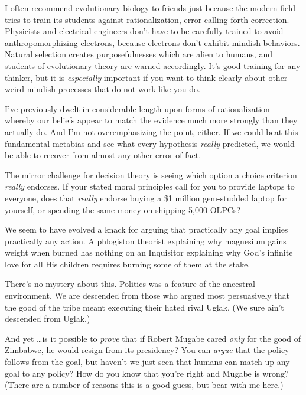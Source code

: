 {
 I often recommend evolutionary biology to friends just because the
modern field tries to train its students against rationalization, error
calling forth correction. Physicists and electrical engineers
don't have to be carefully trained to avoid
anthropomorphizing electrons, because electrons don't
exhibit mindish behaviors. Natural selection creates purposefulnesses
which are alien to humans, and students of evolutionary theory are
warned accordingly. It's good training for any thinker,
but it is \textit{especially} important if you want to think clearly
about other weird mindish processes that do not work like you do.}

\myendsectiontext


\bigskip


{
 I've previously dwelt in considerable length upon
forms of rationalization whereby our beliefs appear to match the
evidence much more strongly than they actually do. And
I'm not overemphasizing the point, either. If we could
beat this fundamental metabias and see what every hypothesis
\textit{really} predicted, we would be able to recover from almost any
other error of fact. }

{
 The mirror challenge for decision theory is seeing which option a
choice criterion \textit{really} endorses. If your stated moral
principles call for you to provide laptops to everyone, does that
\textit{really} endorse buying a \$1 million gem-studded laptop for
yourself, or spending the same money on shipping 5,000 OLPCs?}

{
 We seem to have evolved a knack for arguing that practically any
goal implies practically any action. A phlogiston theorist explaining
why magnesium gains weight when burned has nothing on an Inquisitor
explaining why God's infinite love for all His children
requires burning some of them at the stake.}

{
 There's no mystery about this. Politics was a
feature of the ancestral environment. We are descended from those who
argued most persuasively that the good of the tribe meant executing
their hated rival Uglak. (We sure ain't descended from
Uglak.)}

{
 And yet \ldots is it possible to \textit{prove} that if Robert
Mugabe cared \textit{only} for the good of Zimbabwe, he would resign
from its presidency? You can \textit{argue} that the policy follows
from the goal, but haven't we just seen that humans can
match up any goal to any policy? How do you know that
you're right and Mugabe is wrong? (There are a number
of reasons this is a good guess, but bear with me here.)}

